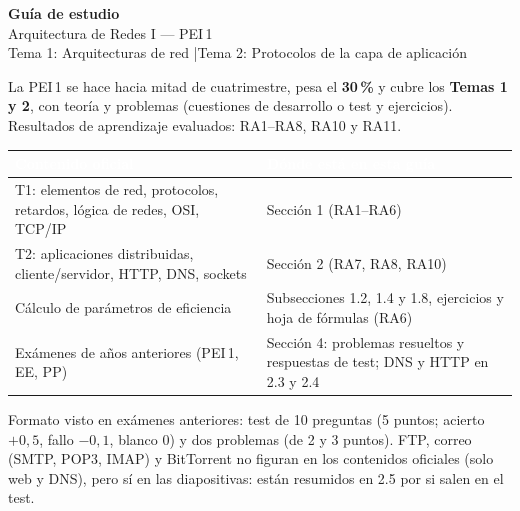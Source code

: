 \documentclass[11pt,a4paper]{article}
\newcommand{\hd}[1]{\cellcolor{uahblue}\textcolor{white}{\textbf{#1}}}
\begin{document}
\begin{tcolorbox}[colback=uahblue,colframe=uahblue,arc=0pt,top=14pt,bottom=14pt,left=14pt,right=14pt]
{\sffamily\Huge\bfseries\color{white}Guía de estudio}\\[4pt]
{\sffamily\Large\color{white}Arquitectura de Redes I --- PEI\,1}\\[4pt]
{\sffamily\color{white!85!uahblue}Tema 1: Arquitecturas de red \quad|\quad Tema 2: Protocolos de la capa de aplicación}
\end{tcolorbox}

\begin{definicion}
La PEI\,1 se hace hacia mitad de cuatrimestre, pesa el \textbf{30\,\%} y cubre los \textbf{Temas 1 y 2}, con teoría y problemas (cuestiones de desarrollo o test y ejercicios). Resultados de aprendizaje evaluados: RA1--RA8, RA10 y RA11.
\vspace{2pt}
\begin{tabularx}{\linewidth}{@{}L{6.4cm}X@{}}
\toprule
\hd{Contenido oficial} & \hd{Dónde está en esta guía} \\
\midrule
T1: elementos de red, protocolos, retardos, lógica de redes, OSI, TCP/IP & Sección 1 (RA1--RA6) \\
T2: aplicaciones distribuidas, cliente/servidor, HTTP, DNS, sockets & Sección 2 (RA7, RA8, RA10) \\
Cálculo de parámetros de eficiencia & Subsecciones 1.2, 1.4 y 1.8, ejercicios y hoja de fórmulas (RA6) \\
Exámenes de años anteriores (PEI\,1, EE, PP) & Sección 4: problemas resueltos y respuestas de test; DNS y HTTP en 2.3 y 2.4 \\
\bottomrule
\end{tabularx}

Formato visto en exámenes anteriores: test de 10 preguntas (5 puntos; acierto $+0{,}5$, fallo $-0{,}1$, blanco $0$) y dos problemas (de 2 y 3 puntos). FTP, correo (SMTP, POP3, IMAP) y BitTorrent no figuran en los contenidos oficiales (solo web y DNS), pero sí en las diapositivas: están resumidos en 2.5 por si salen en el test.
\end{definicion}
\end{document}
